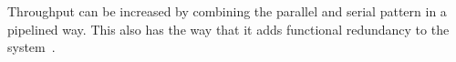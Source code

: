 Throughput can be increased by combining the parallel and serial pattern in a pipelined way.
This also has the way that it adds functional redundancy to the system~\cite{GeffroyMotetDependableComputing}.







